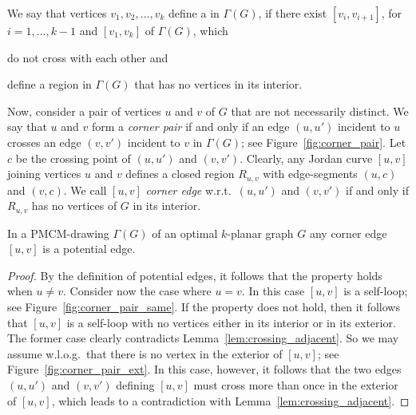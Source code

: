 We say that vertices $v_1,v_2,\dots,v_k$ define a \emph{\pp} in $\Gamma(G)$, if there exist \pes $[v_i,v_{i+1}]$, for $i=1,\dots, k-1$ and \pe $[v_1,v_k]$ of $\Gamma(G)$, which %
\begin{inparaenum}[(i)]
\item do not cross with each other and
\item define a region in $\Gamma(G)$ that has no vertices in its interior.
\end{inparaenum}
%

Now, consider a pair of vertices $u$ and $v$ of $G$ that are not necessarily distinct. We say that $u$ and $v$ form a \emph{corner pair} if and only if an edge $(u,u')$ incident to $u$ crosses an edge $(v,v')$ incident to $v$ in $\Gamma(G)$; see Figure~\ref{fig:corner_pair}. Let $c$ be the crossing point of $(u,u')$ and $(v,v')$. Clearly, any Jordan curve $[u,v]$ joining vertices $u$ and $v$ defines a closed region $R_{u,v}$ with edge-segments $(u,c)$ and $(v,c)$. We call $[u,v]$ \emph{corner edge} w.r.t.~$(u,u')$ and $(v,v')$ if and only if $R_{u,v}$ has no vertices of $G$ in its interior.   

\begin{property}
In a PMCM-drawing $\Gamma(G)$ of an optimal $k$-planar graph $G$ any corner edge $[u,v]$ is a potential edge.
\label{prp:corner}
\end{property}
\begin{proof}
By the definition of potential edges, it follows that the property holds when $u \neq v$. Consider now the case where $u=v$. In this case $[u,v]$ is a self-loop; see Figure~\ref{fig:corner_pair_same}. If the property does not hold, then it follows that $[u,v]$ is a self-loop with no vertices either in its interior or in its exterior. The former case clearly contradicts Lemma~\ref{lem:crossing_adjacent}. So we may assume w.l.o.g.~that there is no vertex in the exterior of $[u,v]$; see Figure~\ref{fig:corner_pair_ext}. In this case, however, it follows that the two edges $(u,u')$ and $(v,v')$ defining $[u,v]$ must cross more than once in the exterior of $[u,v]$, which leads to a contradiction with Lemma~\ref{lem:crossing_adjacent}.
\end{proof}

